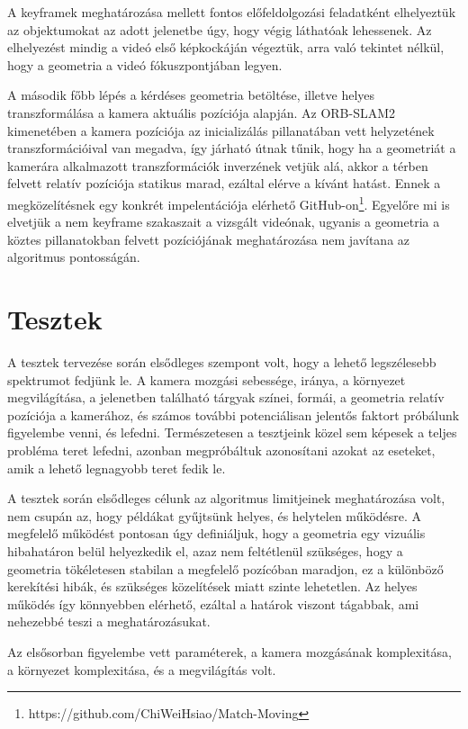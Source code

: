 A keyframek meghatározása mellett fontos előfeldolgozási feladatként elhelyeztük az objektumokat az adott jelenetbe úgy, hogy végig láthatóak lehessenek.
Az elhelyezést mindig a videó első képkockáján végeztük, arra való tekintet nélkül, hogy a geometria a videó fókuszpontjában legyen.

A második főbb lépés a kérdéses geometria betöltése, illetve helyes transzformálása a kamera aktuális pozíciója alapján.
Az ORB-SLAM2 kimenetében a kamera pozíciója az inicializálás pillanatában vett helyzetének transzformációival van megadva, így járható útnak tűnik, hogy ha a geometriát a kamerára alkalmazott transzformációk inverzének vetjük alá, akkor a térben felvett relatív pozíciója statikus marad, ezáltal elérve a kívánt hatást.
Ennek a megközelítésnek egy konkrét impelentációja elérhető GitHub-on\footnote{https://github.com/ChiWeiHsiao/Match-Moving}.
Egyelőre mi is elvetjük a nem keyframe szakaszait a vizsgált videónak, ugyanis a geometria a köztes pillanatokban felvett pozíciójának meghatározása nem javítana az algoritmus pontosságán.


\section{Tesztek}

A tesztek tervezése során elsődleges szempont volt, hogy a lehető legszélesebb spektrumot fedjünk le.
A kamera mozgási sebessége, iránya, a környezet megvilágítása, a jelenetben található tárgyak színei, formái, a geometria relatív pozíciója a kamerához, és számos további potenciálisan jelentős faktort próbálunk figyelembe venni, és lefedni.
Természetesen a tesztjeink közel sem képesek a teljes probléma teret lefedni, azonban megpróbáltuk azonosítani azokat az eseteket, amik a lehető legnagyobb teret fedik le.

A tesztek során elsődleges célunk az algoritmus limitjeinek meghatározása volt, nem csupán az, hogy példákat gyűjtsünk helyes, és helytelen működésre.
A megfelelő működést pontosan úgy definiáljuk, hogy a geometria egy vizuális hibahatáron belül helyezkedik el, azaz nem feltétlenül szükséges, hogy a geometria tökéletesen stabilan a megfelelő pozícóban maradjon, ez a különböző kerekítési hibák, és szükséges közelítések miatt szinte lehetetlen.
Az helyes működés így könnyebben elérhető, ezáltal a határok viszont tágabbak, ami nehezebbé teszi a meghatározásukat.

Az elsősorban figyelembe vett paraméterek, a kamera mozgásának komplexitása, a környezet komplexitása, és a megvilágítás volt.

